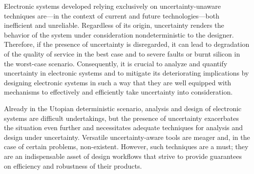 Electronic systems developed relying exclusively on uncertainty-unaware
techniques are---in the context of current and future technologies---both
inefficient and unreliable. Regardless of its origin, uncertainty renders the
behavior of the system under consideration nondeterministic to the designer.
Therefore, if the presence of uncertainty is disregarded, it can lead to
degradation of the quality of service in the best case and to severe faults or
burnt silicon in the worst-case scenario. Consequently, it is crucial to analyze
and quantify uncertainty in electronic systems and to mitigate its deteriorating
implications by designing electronic systems in such a way that they are well
equipped with mechanisms to effectively and efficiently take uncertainty into
consideration.

Already in the Utopian deterministic scenario, analysis and design of electronic
systems are difficult undertakings, but the presence of uncertainty exacerbates
the situation even further and necessitates adequate techniques for analysis and
design under uncertainty. Versatile uncertainty-aware tools are meager and, in
the case of certain problems, non-existent. However, such techniques are a must;
they are an indispensable asset of design workflows that strive to provide
guarantees on efficiency and robustness of their products.

